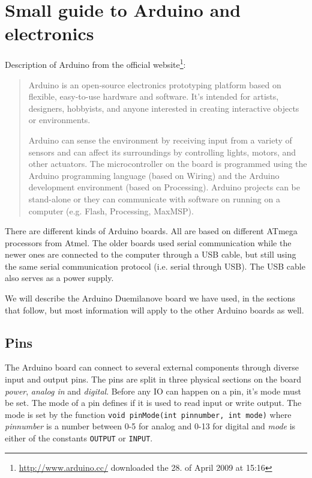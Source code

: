 \documentclass[a4paper,oneside, draft]{memoir}
\begin{document}



\appendix

\chapter{Small guide to Arduino and electronics}


Description of Arduino from the official
website\footnote{\url{http://www.arduino.cc/} downloaded the 28. of April 2009 at 15:16}:
\begin{quotation}
  Arduino is an open-source electronics prototyping platform based on
  flexible, easy-to-use hardware and software. It's intended for
  artists, designers, hobbyists, and anyone interested in creating
  interactive objects or environments.

  Arduino can sense the environment by receiving input from a variety
  of sensors and can affect its surroundings by controlling lights,
  motors, and other actuators. The microcontroller on the board is
  programmed using the Arduino programming language (based on Wiring)
  and the Arduino development environment (based on
  Processing). Arduino projects can be stand-alone or they can
  communicate with software on running on a computer (e.g. Flash,
  Processing, MaxMSP).
\end{quotation}


There are different kinds of Arduino boards. All are based on
different ATmega processors from Atmel. The older boards used serial
communication while the newer ones are connected to the computer
through a USB cable, but still using the same serial communication
protocol (i.e. serial through USB). The USB cable also serves as a
power supply.


We will describe the Arduino Duemilanove board we have used, in the
sections that follow, but most information will apply to
the other Arduino boards as well.

\section{Pins}
The Arduino board can connect to several external components through
diverse input and output pins. The pins are split in three physical sections on
the board \textit{power}, \textit{analog in} and
\textit{digital}. Before any IO can happen on a pin, it's mode must be
set. The mode of a pin defines if it is used to read input or
write output. The mode is set by the function \texttt{void pinMode(int
  pinnumber, int mode)} where \textit{pinnumber} is a number between
0-5 for analog and 0-13 for digital and \textit{mode} is either of the constants
\texttt{OUTPUT} or \texttt{INPUT}.
\end{document}
